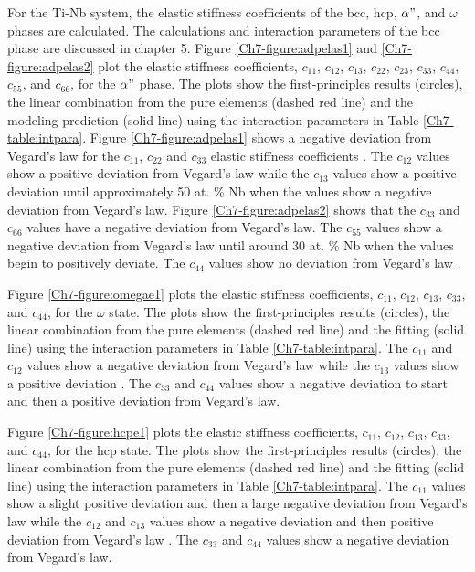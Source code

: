 For the Ti-Nb system, the elastic stiffness coefficients of the bcc, hcp, $\alpha"$, and $\omega$ phases are calculated. The calculations and interaction parameters of the bcc phase are discussed in chapter 5. Figure \ref{Ch7-figure:adpelas1} and \ref{Ch7-figure:adpelas2} plot the elastic stiffness coefficients, $c_{11}$, $c_{12}$, $c_{13}$, $c_{22}$, $c_{23}$, $c_{33}$, $c_{44}$, $c_{55}$, and $c_{66}$, for the $\alpha"$ phase. The plots show the first-principles results (circles), the linear combination from the pure elements (dashed red line) and the modeling prediction (solid line) using the interaction parameters in Table \ref{Ch7-table:intpara}. Figure \ref{Ch7-figure:adpelas1} shows a negative deviation from Vegard's law for the $c_{11}$, $c_{22}$ and $c_{33}$ elastic stiffness coefficients \cite{Denton1991}. The $c_{12}$ values show a positive deviation from Vegard's law while the $c_{13}$ values show a positive deviation until approximately 50 at. \% Nb when the values show a negative deviation from Vegard's law. Figure \ref{Ch7-figure:adpelas2} shows that the $c_{33}$ and $c_{66}$ values have a negative deviation from Vegard's law. The $c_{55}$ values show a negative deviation from Vegard's law until around 30 at. \% Nb when the values begin to positively deviate. The $c_{44}$ values show no deviation from Vegard's law \cite{Denton1991}.

Figure \ref{Ch7-figure:omegae1} plots the elastic stiffness coefficients, $c_{11}$, $c_{12}$, $c_{13}$, $c_{33}$, and $c_{44}$, for the $\omega$ state. The plots show the first-principles results (circles), the linear combination from the pure elements (dashed red line) and the fitting (solid line) using the interaction parameters in Table \ref{Ch7-table:intpara}. The $c_{11}$ and $c_{12}$ values show a negative deviation from Vegard's law while the $c_{13}$ values show a positive deviation \cite{Denton1991}. The $c_{33}$ and $c_{44}$ values show a negative deviation to start and then a positive deviation from Vegard's law. 

Figure \ref{Ch7-figure:hcpe1} plots the elastic stiffness coefficients, $c_{11}$, $c_{12}$, $c_{13}$, $c_{33}$, and $c_{44}$, for the hcp state. The plots show the first-principles results (circles), the linear combination from the pure elements (dashed red line) and the fitting (solid line) using the interaction parameters in Table \ref{Ch7-table:intpara}. The $c_{11}$ values show a slight positive deviation and then a large negative deviation from Vegard's law while the $c_{12}$ and $c_{13}$ values show a negative deviation and then positive deviation from Vegard's law \cite{Denton1991}. The $c_{33}$ and $c_{44}$ values show a negative deviation from Vegard's law.

